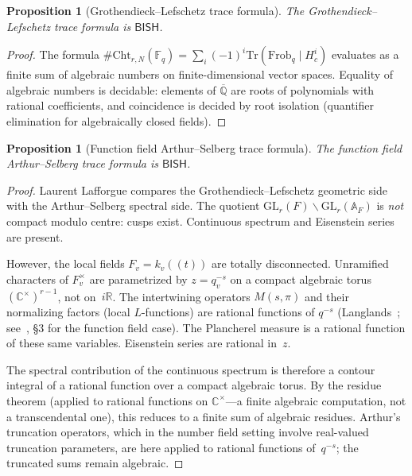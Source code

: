 \documentclass[11pt]{article}
\theoremstyle{plain}
\newtheorem{proposition}[theorem]{Proposition}
\theoremstyle{definition}
\theoremstyle{remark}
\newcommand{\Q}{\mathbb{Q}}
\newcommand{\R}{\mathbb{R}}
\newcommand{\C}{\mathbb{C}}
\newcommand{\Fq}{\mathbb{F}_q}
\newcommand{\A}{\mathbb{A}}
\newcommand{\GL}{\mathrm{GL}}
\newcommand{\Frob}{\mathrm{Frob}}
\newcommand{\Tr}{\mathrm{Tr}}
\newcommand{\Cht}{\mathrm{Cht}}
\newcommand{\BISH}{\mathsf{BISH}}
\begin{document}
\begin{proposition}[Grothendieck--Lefschetz trace formula]\label{prop:GL-trace}
The Grothendieck--Lefschetz trace formula is $\BISH$.
\end{proposition}

\begin{proof}
The formula $\#\Cht_{r,N}(\Fq) = \sum_i (-1)^i \Tr(\Frob_q \mid H^i_c)$
evaluates as a finite sum of algebraic numbers on finite-dimensional vector
spaces. Equality of algebraic numbers is decidable: elements of $\overline{\Q}$
are roots of polynomials with rational coefficients, and coincidence is
decided by root isolation (quantifier elimination for algebraically closed
fields).
\end{proof}

\begin{proposition}[Function field Arthur--Selberg trace formula]\label{prop:AS-func}
The function field Arthur--Selberg trace formula is $\BISH$.
\end{proposition}

\begin{proof}
Laurent Lafforgue compares the Grothendieck--Lefschetz geometric side with the
Arthur--Selberg spectral side. The quotient
$\GL_r(F) \backslash \GL_r(\A_F)$ is \emph{not} compact modulo centre: cusps
exist. Continuous spectrum and Eisenstein series are present.

However, the local fields $F_v = k_v((t))$ are totally disconnected. Unramified
characters of $F_v^\times$ are parametrized by $z = q_v^{-s}$ on a compact
algebraic torus $(\C^\times)^{r-1}$, not on~$i\R$. The intertwining operators
$M(s,\pi)$ and their normalizing factors (local $L$-functions) are rational
functions of $q^{-s}$ (Langlands~\cite{Langlands71}; see~\cite{Laumon00},
\S3 for the function field case). The Plancherel measure is a rational function
of these same variables. Eisenstein series are rational in~$z$.

The spectral contribution of the continuous spectrum is therefore a contour
integral of a rational function over a compact algebraic torus. By the residue
theorem (applied to rational functions on $\C^\times$---a finite algebraic
computation, not a transcendental one), this reduces to a finite sum of
algebraic residues. Arthur's truncation operators, which in the number field
setting involve real-valued truncation parameters, are here applied to rational
functions of~$q^{-s}$; the truncated sums remain algebraic.
\end{proof}
\end{document}
